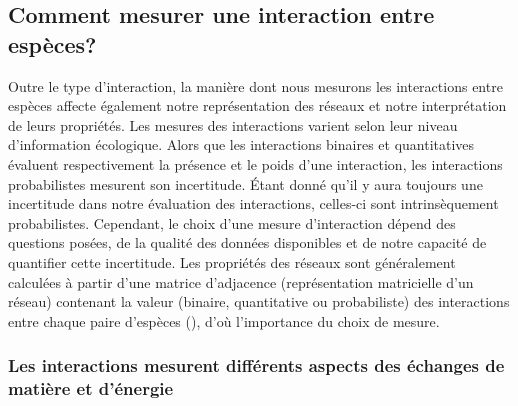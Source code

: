 \subsection{Comment mesurer une interaction entre espèces?} 

Outre le type d'interaction, la manière dont nous mesurons les interactions
entre espèces affecte également notre représentation des réseaux et notre
interprétation de leurs propriétés. Les mesures des interactions varient selon
leur niveau d'information écologique. Alors que les interactions binaires et
quantitatives évaluent respectivement la présence et le poids d'une interaction,
les interactions probabilistes mesurent son incertitude. Étant donné qu'il y
aura toujours une incertitude dans notre évaluation des interactions, celles-ci
sont intrinsèquement probabilistes. Cependant, le choix d'une mesure
d'interaction dépend des questions posées, de la qualité des données disponibles
et de notre capacité de quantifier cette incertitude. Les propriétés des réseaux
sont généralement calculées à partir d'une matrice d'adjacence (représentation
matricielle d'un réseau) contenant la valeur (binaire, quantitative ou
probabiliste) des interactions entre chaque paire d'espèces
(\cite{Delmas2019Analysing}), d'où l'importance du choix de mesure.

\subsubsection{Les interactions mesurent différents aspects des échanges de matière et d'énergie} 

